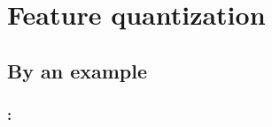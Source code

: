 \documentclass[english,xcolor={rgb,dvipsnames,table,usenames}]{beamer}
\begin{document}
 
% 
%
%
%
%
%
%
%
%
%






\section{Feature quantization}


\subsection{By an example}

{
\begin{frame}
\frametitle{\secname: \subsecname}

\begin{figure}[!ht]
\end{figure}

\end{frame}
}
\end{document}
